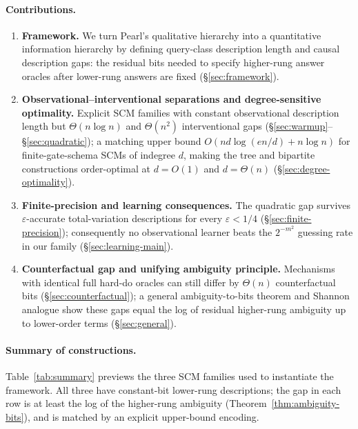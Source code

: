 \documentclass{article}
\theoremstyle{plain}
\theoremstyle{definition}
\begin{document}
\paragraph{Contributions.}
\begin{enumerate}
    \item \textbf{Framework.} We turn Pearl's qualitative hierarchy into a quantitative information hierarchy by defining query-class description length and causal description gaps: the residual bits needed to specify higher-rung answer oracles after lower-rung answers are fixed (\S\ref{sec:framework}).
    \item \textbf{Observational--interventional separations and degree-sensitive optimality.} Explicit SCM families with constant observational description length but $\Theta(n \log n)$ and $\Theta(n^2)$ interventional gaps (\S\ref{sec:warmup}--\S\ref{sec:quadratic}); a matching upper bound $O(nd \log(en/d) + n \log n)$ for finite-gate-schema SCMs of indegree $d$, making the tree and bipartite constructions order-optimal at $d = O(1)$ and $d = \Theta(n)$ (\S\ref{sec:degree-optimality}).
    \item \textbf{Finite-precision and learning consequences.} The quadratic gap survives $\varepsilon$-accurate total-variation descriptions for every $\varepsilon < 1/4$ (\S\ref{sec:finite-precision}); consequently no observational learner beats the $2^{-m^2}$ guessing rate in our family (\S\ref{sec:learning-main}).
    \item \textbf{Counterfactual gap and unifying ambiguity principle.} Mechanisms with identical full hard-do oracles can still differ by $\Theta(n)$ counterfactual bits (\S\ref{sec:counterfactual}); a general ambiguity-to-bits theorem and Shannon analogue show these gaps equal the log of residual higher-rung ambiguity up to lower-order terms (\S\ref{sec:general}).
\end{enumerate}

\paragraph{Summary of constructions.}
Table~\ref{tab:summary} previews the three SCM families used to instantiate the framework. All three have constant-bit lower-rung descriptions; the gap in each row is at least the log of the higher-rung ambiguity (Theorem~\ref{thm:ambiguity-bits}), and is matched by an explicit upper-bound encoding.
\end{document}

